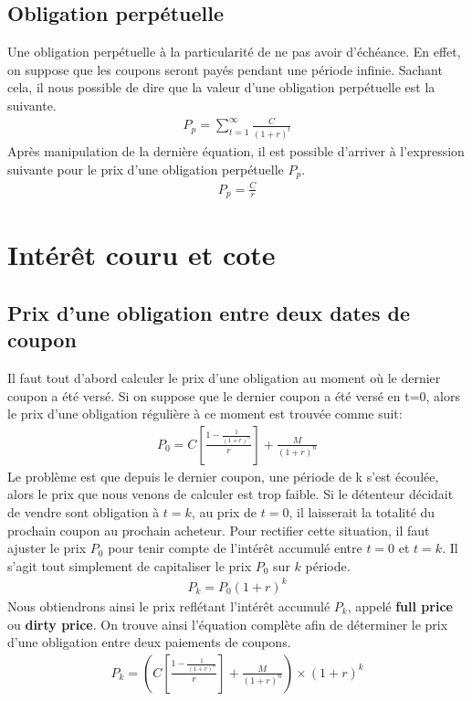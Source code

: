 \documentclass[12pt]{article}
\begin{document}
\subsection{Obligation perpétuelle}
Une obligation perpétuelle à la particularité de ne pas avoir d'échéance. En effet, on suppose que les coupons seront payés pendant une période infinie. Sachant cela, il nous possible de dire que la valeur d'une obligation perpétuelle est la suivante.
\begin{align*}
P_{p}=\sum_{t=1}^{\infty} \frac{C}{(1+r)^t}
\end{align*} 
Après manipulation de la dernière équation, il est possible d'arriver à l'expression suivante  pour le prix d'une obligation perpétuelle $P_p$.
\begin{align*}
P_p=\frac{C}{r}
\end{align*}

\section{Intérêt couru et cote}

\subsection{Prix d'une obligation entre deux dates de coupon}
Il faut tout d'abord calculer le prix d'une obligation au moment où le dernier coupon a été versé. Si on suppose que le dernier coupon a été versé en t=0, alors le prix d'une obligation régulière à ce moment est trouvée comme suit:
\begin{align*}
P_0=C \left[ \frac{1-\frac{1}{(1+r)^n}}{r} \right]+\frac{M}{(1+r)^n}
\end{align*}
Le problème est que depuis le dernier coupon, une période de k s'est écoulée, alors le prix que nous venons de calculer est trop faible. Si le détenteur décidait de vendre sont obligation à $t= k$, au prix de $t=0$, il laisserait la totalité du prochain coupon au prochain acheteur. Pour rectifier cette situation, il faut ajuster le prix $P_0$ pour tenir compte de l'intérêt accumulé entre $t=0$ et $t=k$. Il s'agit tout simplement de capitaliser le prix $P_0$ sur $k$ période. 
\begin{align*}
P_k=P_0 (1+r)^k
\end{align*}
Nous obtiendrons ainsi le prix reflétant l'intérêt accumulé $P_k$, appelé \textbf{full price} ou \textbf{dirty price}. On trouve ainsi l'équation complète afin de déterminer le prix d'une obligation entre deux paiements de coupons.
\begin{align*}
P_k= \left( C \left[ \frac{1-\frac{1}{(1+r)^n}}{r} \right]+\frac{M}{(1+r)^n} \right) \times (1+r)^k
\end{align*}
\newpage
\end{document}
